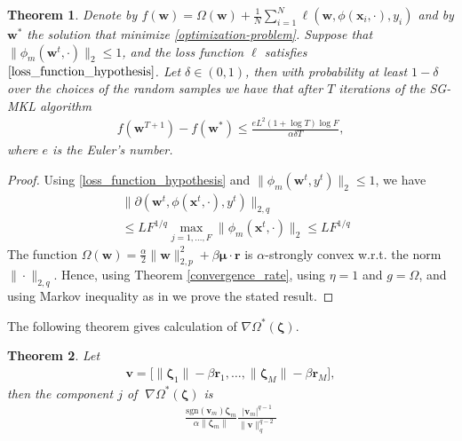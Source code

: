 \documentclass{article}
\newtheorem{theorem}{Theorem}
\begin{document}
\begin{theorem}
Denote by $f(\mathbf{w})=\Omega(\mathbf{w})+\frac{1}{N}\sum_{i=1}^N\ell(\mathbf{w},\phi(\mathbf{x}_i,\cdot),y_i)$ and by $\mathbf{w}^\ast$ the solution that minimize \eqref{optimization-problem}. Suppose that $\|\phi_m(\mathbf{w}^t,\cdot)\|_2 \leq 1$, and the loss function $\ell$ satisfies $\eqref{loss_function_hypothesis}$. Let $\delta \in (0,1)$, then with probability at least $1 - \delta$ over the choices of the random samples we have that after $T$ iterations of the SG-MKL algorithm
\begin{align*}
    f(\mathbf{w}^{T+1})-f(\mathbf{w^\ast}) \leq \frac{eL^2(1+\log T)\log F}{\alpha\delta T},
\end{align*}
where $e$ is the Euler's number.
\end{theorem}
\begin{proof}
Using \eqref{loss_function_hypothesis} and $\|\phi_m(\mathbf{w}^t, y^t)\|_2 \leq 1$, we have
\begin{align*}
    &\|\partial(\mathbf{w}^t,\phi(\mathbf{x}^t,\cdot), y^t)\|_{2,q} \\
    &\leq LF^{1/q} \max_{j=1, \ldots, F} \|\phi_m(\mathbf{x}^t, \cdot)\|_2 \leq LF^{1/q}
\end{align*}
The function $\Omega(\mathbf{w})=\frac{\alpha}{2}\|\mathbf{w}\|_{2,p}^2 + \beta\mathbf{\mu} \cdot \mathbf{r}$ is $\alpha$-strongly convex w.r.t. the norm $\|\cdot\|_{2,q}$. Hence, using Theorem \ref{convergence_rate}, using $\eta=1$ and $g=\Omega$, and using Markov inequality as in \cite{Shalev-ShwartzSS07} we prove the stated result.
\end{proof}
The following theorem gives calculation of $\nabla\Omega^\ast(\mathbf{\zeta})$.
\begin{theorem}
\label{theorem-fenchel-dual}
Let
\begin{align*}
    \mathbf{v}=\Big[\|\mathbf{\zeta}_1\|-\beta\mathbf{r}_1,\ldots,
    \|\mathbf{\zeta}_M\|-\beta\mathbf{r}_M\Big],
\end{align*}
then the component $j$ of $\;\nabla\Omega^\ast(\mathbf{\zeta})$ is
\begin{align*}
\frac{\text{sgn}(\mathbf{v}_m) \mathbf{\zeta}_m}{\alpha\|\mathbf{\zeta}_m\|}
       \frac{|\mathbf{v}_m|^{q-1}}{\|\mathbf{v}\|_q^{q-2}}
\end{align*}
\end{theorem}
\end{document}
